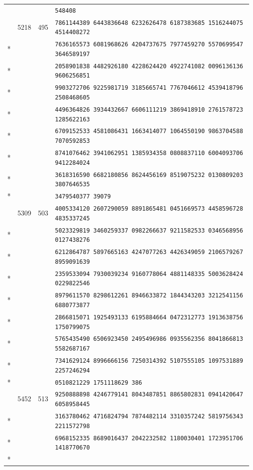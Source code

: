 \documentclass[10pt]{article}
\begin{document}
\begin{longtable}{@{}r@{\quad}r@{\quad}r@{\quad}l@{}}
 & &  & \texttt{548408}\\
\addlinespace[2pt]
93 & 5218 & 495 & \texttt{7861144389 6443836648 6232626478 6187383685 1516244075 4514408272}\\*
 & &  & \texttt{7636165573 6081968626 4204737675 7977459270 5570699547 3646589197}\\*
 & &  & \texttt{2058901838 4482926180 4228624420 4922741082 0096136136 9606256851}\\*
 & &  & \texttt{9903272706 9225981719 3185665741 7767046612 4539418796 2508468605}\\*
 & &  & \texttt{4496364826 3934432667 6606111219 3869418910 2761578723 1285622163}\\*
 & &  & \texttt{6709152533 4581086431 1663414077 1064550190 9863704588 7070592853}\\*
 & &  & \texttt{8741076462 3941062951 1385934358 0808837110 6004093706 9412284024}\\*
 & &  & \texttt{3618316590 6682180856 8624456169 8519075232 0130809203 3807646535}\\*
 & &  & \texttt{3479540377 39079}\\
\addlinespace[2pt]
94 & 5309 & 503 & \texttt{4005334120 2607290059 8891865481 0451669573 4458596728 4835337245}\\*
 & &  & \texttt{5023329819 3460259337 0982266637 9211582533 0346568956 0127438276}\\*
 & &  & \texttt{6212864787 5897665163 4247077263 4426349059 2106579267 8959091639}\\*
 & &  & \texttt{2359533094 7930039234 9160778064 4881148335 5003628424 0229822546}\\*
 & &  & \texttt{8979611570 8298612261 8946633872 1844343203 3212541156 6880773877}\\*
 & &  & \texttt{2866815071 1925493133 6195884664 0472312773 1913638756 1750799075}\\*
 & &  & \texttt{5765435490 6506923450 2495496986 0935562356 8041866813 5582687167}\\*
 & &  & \texttt{7341629124 8996666156 7250314392 5107555105 1097531889 2257246294}\\*
 & &  & \texttt{0510821229 1751118629 386}\\
\addlinespace[2pt]
95 & 5452 & 513 & \texttt{9250888898 4246779141 8043487851 8865802831 0941420647 6058958445}\\*
 & &  & \texttt{3163780462 4716824794 7874482114 3310357242 5819756343 2211572798}\\*
 & &  & \texttt{6968152335 8689016437 2042232582 1180030401 1723951706 1418770670}\\*

\end{longtable}
\end{document}
